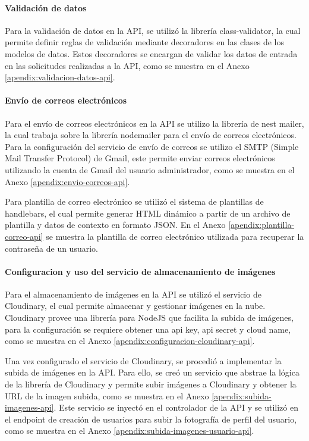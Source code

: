 \paragraph{Validación de datos}
Para la validación de datos en la API, se utilizó la librería class-validator, la cual permite definir reglas de validación mediante
decoradores en las clases de los modelos de datos. Estos decoradores se encargan de validar los datos de entrada en las solicitudes
realizadas a la API, como se muestra en el Anexo \ref{apendix:validacion-datos-api}.

\paragraph{Envío de correos electrónicos}
Para el envío de correos electrónicos en la API se utilizo la librería de nest mailer, la cual trabaja sobre la librería nodemailer
para el envío de correos electrónicos. Para la configuración del servicio de envío de correos se utilizo el SMTP (Simple Mail Transfer
Protocol) de Gmail, este permite enviar correos electrónicos utilizando la cuenta de Gmail del usuario administrador, como se muestra
en el Anexo \ref{apendix:envio-correos-api}.
\bigbreak

Para plantilla de correo electrónico se utilizó el sistema de plantillas de handlebars, el cual permite generar HTML dinámico a partir
de un archivo de plantilla y datos de contexto en formato JSON. En el Anexo \ref{apendix:plantilla-correo-api} se muestra la plantilla
de correo electrónico utilizada para recuperar la contraseña de un usuario.

\paragraph{Configuracion y uso del servicio de almacenamiento de imágenes}
Para el almacenamiento de imágenes en la API se utilizó el servicio de Cloudinary, el cual permite almacenar y gestionar imágenes en la nube.
Cloudinary provee una librería para NodeJS que facilita la subida de imágenes, para la configuración se requiere obtener una api key, api secret
y cloud name, como se muestra en el Anexo \ref{apendix:configuracion-cloudinary-api}.
\bigbreak

Una vez configurado el servicio de Cloudinary, se procedió a implementar la subida de imágenes en la API. Para ello, se creó un servicio
que abstrae la lógica de la librería de Cloudinary y permite subir imágenes a Cloudinary y obtener la URL de la imagen subida, como se
muestra en el Anexo \ref{apendix:subida-imagenes-api}. Este servicio se inyectó en el controlador de la API y se utilizó en el endpoint
de creación de usuarios para subir la fotografía de perfil del usuario, como se muestra en el Anexo \ref{apendix:subida-imagenes-usuario-api}.

